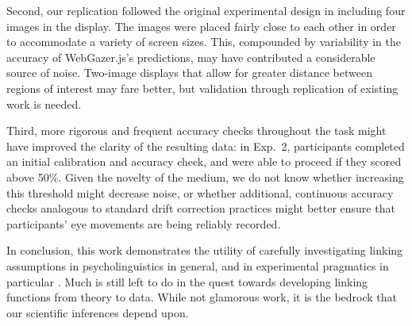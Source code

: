 \documentclass[10pt,letterpaper]{article}
\begin{document}

Second, our replication followed the original experimental design in including four images in the display. The images were placed fairly close to each other in order to accommodate a variety of screen sizes. This, compounded by variability in the accuracy of WebGazer.js's predictions, may have contributed a considerable source of noise. Two-image displays that allow for greater distance between regions of interest may fare better, but validation through replication of existing work is needed. 

Third, more rigorous and frequent accuracy checks throughout the task might have improved the clarity of the resulting data: in Exp.~2, participants completed an initial calibration and accuracy check, and were able to proceed if they scored above 50\%. Given the novelty of the medium, we do not know whether increasing this threshold might decrease noise, or whether additional, continuous accuracy checks analogous to standard drift correction practices might better ensure that participants' eye movements are being reliably recorded.


In conclusion, this work demonstrates the utility of carefully investigating linking assumptions in psycholinguistics in general, and in experimental pragmatics in particular \cite<see also>{franke2016link,WaldonDegen2020}. Much is still left to do in the quest towards developing linking functions from theory to data. While not glamorous work, it is the bedrock that our scientific inferences depend upon.
\end{document}
